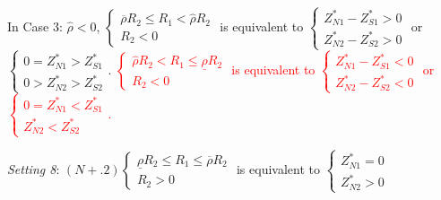 \documentclass[10pt]{article}
\newcommand{\hhred}{\textcolor{red}}
\begin{document}
In Case 3: $ {\hat \rho} < 0 $, $ \left\{ \begin{matrix} \overline{\rho} R_2 \leqslant R_1 < {\hat \rho} R_2 \\ R_2 < 0 \end{matrix} \right. $ is equivalent to $ \left\{ \begin{matrix} Z_{N 1}^* - Z_{S 1}^* > 0 \\ Z_{N 2}^* - Z_{S 2}^* > 0 \end{matrix} \right. $ or $ \left\{ \begin{matrix} 0 = Z_{N 1}^* > Z_{S 1}^* \\ 0 > Z_{N 2}^* > Z_{S 2}^* \end{matrix} \right. $. \hhred{$ \left\{ \begin{matrix} {\hat \rho} R_2 < R_1 \leqslant \underline{\rho} R_2 \\ R_2 < 0 \end{matrix} \right. $ is equivalent to $ \left\{ \begin{matrix} Z_{N 1}^* - Z_{S 1}^* < 0 \\ Z_{N 2}^* - Z_{S 2}^* < 0 \end{matrix} \right. $ or $ \left\{ \begin{matrix} 0 = Z_{N 1}^* < Z_{S 1}^* \\ Z_{N 2}^* < Z_{S 2}^* \end{matrix} \right. $.}

{\it Setting 8}: $ (N+.2) \left\{ \begin{matrix} \underline{\rho} R_2 \leqslant R_1 \leqslant \overline{\rho} R_2 \\ R_2 > 0 \end{matrix} \right. $ is equivalent to $ \left\{ \begin{matrix} Z_{N 1}^* = 0 \\ Z_{N 2}^* > 0 \end{matrix} \right. $
\end{document}
